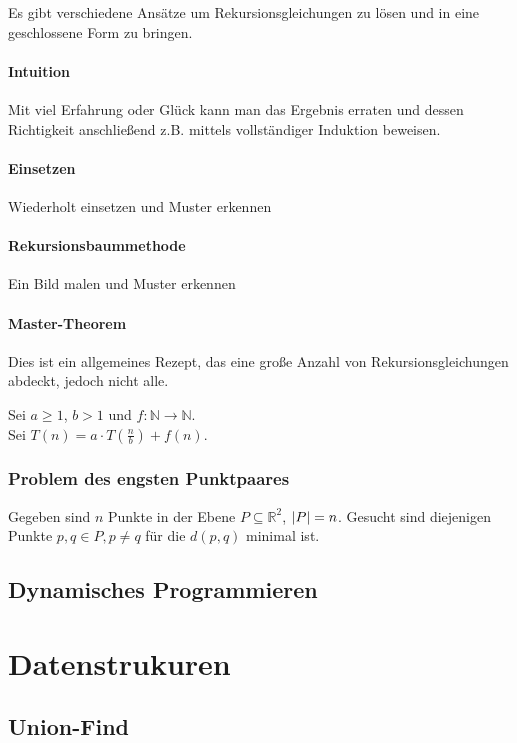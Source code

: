 Es gibt verschiedene Ansätze um Rekursionsgleichungen zu lösen und in eine geschlossene Form zu bringen.

\paragraph{Intuition}
Mit viel Erfahrung oder Glück kann man das Ergebnis erraten und dessen
Richtigkeit anschließend z.B. mittels vollständiger Induktion beweisen.

\paragraph{Einsetzen} Wiederholt einsetzen und Muster erkennen

\paragraph{Rekursionsbaummethode} Ein Bild malen und Muster erkennen

\paragraph{Master-Theorem}
Dies ist ein allgemeines Rezept, das eine große Anzahl von Rekursionsgleichungen
abdeckt, jedoch nicht alle.

Sei $a \geq 1$, $b > 1$ und $f: \mathbb{N} \rightarrow \mathbb{N}$.\\
Sei $T(n) = a \cdot T(\frac{n}{b}) + f(n)$.

\subsubsection{Problem des engsten Punktpaares}

Gegeben sind $n$ Punkte in der Ebene $P \subseteq \mathbb{R}^2$, $\left|P\right| = n$.
Gesucht sind diejenigen Punkte $p, q \in P, p \neq q$ für die $d(p, q)$ minimal ist.

\subsection{Dynamisches Programmieren}



\section{Datenstrukuren}

\subsection{Union-Find}

